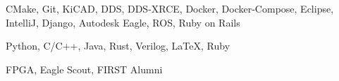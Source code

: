 
CMake, Git, KiCAD, DDS, DDS-XRCE, Docker, Docker-Compose, Eclipse, IntelliJ, Django, Autodesk Eagle, ROS, Ruby on Rails

Python, C/C++, Java, Rust, Verilog, \LaTeX, Ruby

FPGA, Eagle Scout, FIRST Alumni



